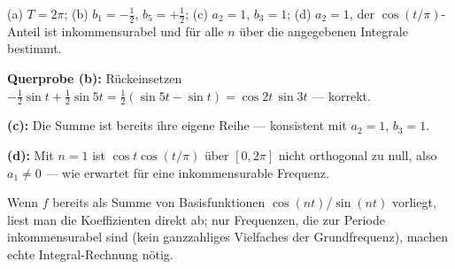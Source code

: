 \begin{ergebnis}
(a) $T=2\pi$; (b) $b_1=-\tfrac12$, $b_5=+\tfrac12$;
(c) $a_2=1$, $b_3=1$; (d) $a_2=1$, der $\cos(t/\pi)$-Anteil ist inkommensurabel
und für alle $n$ über die angegebenen Integrale bestimmt.
\end{ergebnis}

\begin{kontrolle}
\textbf{Querprobe (b):} Rückeinsetzen $-\tfrac12\sin t+\tfrac12\sin5t
=\tfrac12(\sin5t-\sin t)=\cos2t\,\sin3t$ --- korrekt. \checkmark

\textbf{(c):} Die Summe ist bereits ihre eigene Reihe --- konsistent mit
$a_2=1$, $b_3=1$. \checkmark

\textbf{(d):} Mit $n=1$ ist $\cos t\cos(t/\pi)$ über $[0,2\pi]$ nicht
orthogonal zu null, also $a_1\neq0$ --- wie erwartet für eine inkommensurable
Frequenz.
\end{kontrolle}

\begin{merksatz}
Wenn $f$ bereits als Summe von Basisfunktionen $\cos(nt)$/$\sin(nt)$ vorliegt,
liest man die Koeffizienten direkt ab; nur Frequenzen, die zur Periode
inkommensurabel sind (kein ganzzahliges Vielfaches der Grundfrequenz),
machen echte Integral-Rechnung nötig.
\end{merksatz}
